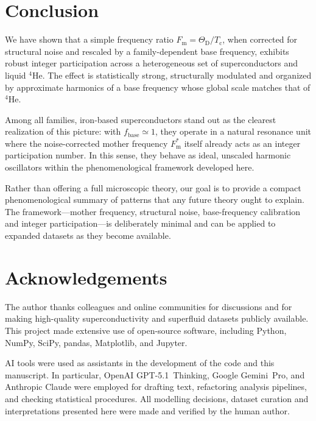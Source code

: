 \documentclass[aps,prb,twocolumn,superscriptaddress,floatfix,nofootinbib]{revtex4-2}
\newcommand{\Tc}{\ensuremath{T_{\mathrm{c}}}}
\newcommand{\ThetaD}{\ensuremath{\Theta_{\mathrm{D}}}}
\newcommand{\Fm}{\ensuremath{F_{\mathrm{m}}}}
\newcommand{\Fmstar}{\ensuremath{{F_{\mathrm{m}}^{\ast}}}}
\newcommand{\fbase}{\ensuremath{{f_{\mathrm{base}}}}}
\newcommand{\He}{\ensuremath{\mathrm{He}}}
\newcommand{\HeFour}{\ensuremath{{^{4}\He}}}
\begin{document}
\section{Conclusion}
\label{sec:conclusion}

We have shown that a simple frequency ratio
$\Fm = \ThetaD / \Tc$, when corrected for structural noise
and rescaled by a family-dependent base frequency,
exhibits robust integer participation across a heterogeneous set
of superconductors and liquid \HeFour.
The effect is statistically strong, structurally modulated and
organized by approximate harmonics of a base frequency whose global
scale matches that of \HeFour.

Among all families, iron-based superconductors stand out as the
clearest realization of this picture: with $\fbase \simeq 1$,
they operate in a natural resonance unit where the noise-corrected
mother frequency $\Fmstar$ itself already acts as an integer
participation number.
In this sense, they behave as ideal, unscaled harmonic oscillators
within the phenomenological framework developed here.

Rather than offering a full microscopic theory, our goal is to
provide a compact phenomenological summary of patterns that any
future theory ought to explain.
The framework---mother frequency, structural noise, base-frequency
calibration and integer participation---is deliberately minimal
and can be applied to expanded datasets as they become available.

\section*{Acknowledgements}

The author thanks colleagues and online communities for discussions and for
making high-quality superconductivity and superfluid datasets publicly
available. This project made extensive use of open-source software, including
Python, NumPy, SciPy, pandas, Matplotlib, and Jupyter.

AI tools were used as assistants in the development of the code and this
manuscript. In particular, OpenAI GPT-5.1~Thinking, Google Gemini~Pro, and
Anthropic Claude were employed for drafting text, refactoring analysis
pipelines, and checking statistical procedures. All modelling decisions,
dataset curation and interpretations presented here were made and verified by
the human author.
\end{document}
